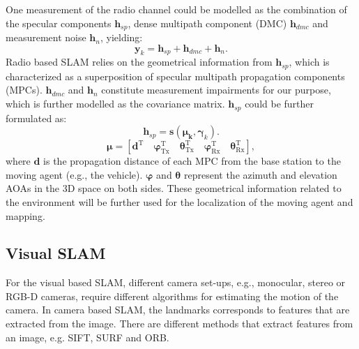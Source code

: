 One measurement of the radio channel could be modelled as the combination of the specular components $ \mathbf{h}_{sp} $, dense multipath component (DMC) $ \mathbf{h}_{dmc} $ and measurement noise $ \mathbf{h}_n $, yielding:
\begin{equation}
\mathbf{y}_k = \mathbf{h}_{sp} + \mathbf{h}_{dmc} + \mathbf{h}_n.
\label{eq:channelmodel}
\end{equation}
Radio based SLAM relies on the geometrical information from $ \mathbf{h}_{sp} $, which is characterized as a superposition of specular multipath propagation components (MPCs). $ \mathbf{h}_{dmc} $ and $ \mathbf{h}_n $ constitute measurement impairments for our purpose, which is further modelled as the covariance matrix. $ \mathbf{h}_{sp} $ could be further formulated as:
\begin{equation}
\mathbf{h}_{sp} = \textbf{s}(\mathbf{\boldsymbol{\mu}_k}, \mathbf{\boldsymbol{\gamma}}_k).
\label{eq:channelmodel}
\end{equation}
\begin{equation}
\mathbf{\boldsymbol{\mu}} = [\mathbf{\boldsymbol{d}}^\text{T} \quad  \mathbf{\boldsymbol{\varphi}}^\text{T}_\text{Tx} \quad  \mathbf{\boldsymbol{\theta}}^\text{T}_\text{Tx} \quad \mathbf{\boldsymbol{\varphi}}^\text{T}_\text{Rx} \quad  \mathbf{\boldsymbol{\theta}}^\text{T}_\text{Rx}],
\end{equation}
where $ \mathbf{\boldsymbol{d}} $ is the propagation distance of each MPC from the base station to the moving agent (e.g., the vehicle). $ \mathbf{\boldsymbol{\varphi}} $ and $ \mathbf{\boldsymbol{\theta}} $ represent the azimuth and elevation AOAs in the 3D space on both sides. These geometrical information related to the environment will be further used for the localization of the moving agent and mapping.



\subsection{Visual SLAM}

For the visual based \gls{SLAM}, different camera set-ups, e.g., monocular, 
stereo or RGB-D
cameras, require different algorithms for estimating the motion of
the camera. In camera based \gls{SLAM}, the landmarks corresponds to features 
that are extracted from the image. There are different methods that extract 
features from an image, e.g. \gls{SIFT}\cite{Lowe:1999:ORL:850924.851523},  
\gls{SURF}\cite{Bay:2008:SRF:1370312.1370556} and 
\gls{ORB}\cite{Rublee:2011:OEA:2355573.2356268}.

